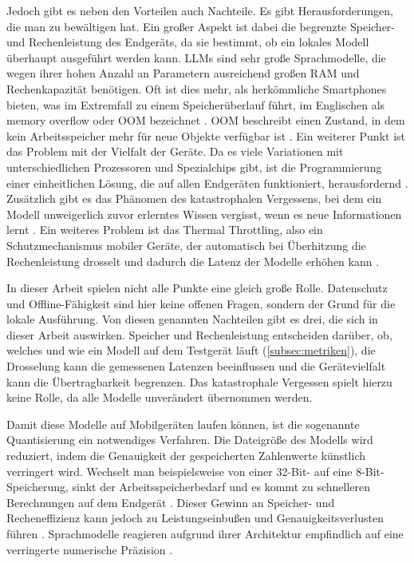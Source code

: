 \noindent Jedoch gibt es neben den Vorteilen auch Nachteile. Es gibt Herausforderungen, die man zu bewältigen hat. Ein großer Aspekt ist dabei die begrenzte Speicher- und Rechenleistung des Endgeräts, da sie bestimmt, ob ein lokales Modell überhaupt ausgeführt werden kann. \acp{LLM} sind sehr große Sprachmodelle, die wegen ihrer hohen Anzahl an Parametern ausreichend großen \ac{RAM} und Rechenkapazität benötigen. Oft ist dies mehr, als herkömmliche Smartphones bieten, was im Extremfall zu einem Speicherüberlauf führt, im Englischen als memory overflow oder \ac{OOM} bezeichnet \autocite{edgellm_review, android_oom}. \ac{OOM} beschreibt einen Zustand, in dem kein Arbeitsspeicher mehr für neue Objekte verfügbar ist \autocite{android_oom}.
Ein weiterer Punkt ist das Problem mit der Vielfalt der Geräte. Da es viele Variationen mit unterschiedlichen Prozessoren und Spezialchips gibt, ist die Programmierung einer einheitlichen Lösung, die auf allen Endgeräten funktioniert, herausfordernd \autocite{edgellm_review}.
Zusätzlich gibt es das Phänomen des katastrophalen Vergessens, bei dem ein Modell unweigerlich zuvor erlerntes Wissen vergisst, wenn es neue Informationen lernt \autocite{edgellm_review}.
Ein weiteres Problem ist das Thermal Throttling, also ein Schutzmechanismus mobiler Geräte, der automatisch bei Überhitzung die Rechenleistung drosselt und dadurch die Latenz der Modelle erhöhen kann \autocite{zhou2022throttling}.
\vspace{\baselineskip}

\noindent In dieser Arbeit spielen nicht alle Punkte eine gleich große Rolle. Datenschutz und Offline-Fähigkeit sind hier keine offenen Fragen, sondern der Grund für die lokale Ausführung. Von diesen genannten Nachteilen gibt es drei, die sich in dieser Arbeit auswirken. Speicher und Rechenleistung entscheiden darüber, ob, welches und wie ein Modell auf dem Testgerät läuft (\autoref{subsec:metriken}), die Drosselung kann die gemessenen Latenzen beeinflussen \autocite{zhou2022throttling} und die Gerätevielfalt kann die Übertragbarkeit begrenzen. Das katastrophale Vergessen spielt hierzu keine Rolle, da alle Modelle unverändert übernommen werden.
\vspace{\baselineskip}

\noindent Damit diese Modelle auf Mobilgeräten laufen können, ist die sogenannte Quantisierung ein notwendiges Verfahren. Die Dateigröße des Modells wird reduziert, indem die Genauigkeit der gespeicherten Zahlenwerte künstlich verringert wird. Wechselt man beispielsweise von einer 32-Bit- auf eine 8-Bit-Speicherung, sinkt der Arbeitsspeicherbedarf und es kommt zu schnelleren Berechnungen auf dem Endgerät \autocite{edgellm_review}. Dieser Gewinn an Speicher- und Recheneffizienz kann jedoch zu Leistungseinbußen und Genauigkeitsverlusten führen \autocite{edgellm_review}. Sprachmodelle reagieren aufgrund ihrer Architektur empfindlich auf eine verringerte numerische Präzision \autocite{edgellm_review}.

